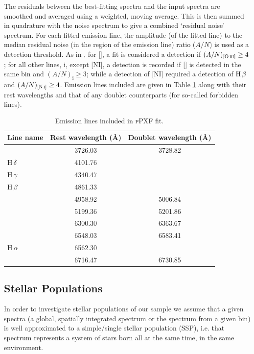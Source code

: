 		The residuals between the best-fitting spectra and the input spectra are smoothed and averaged using a weighted, moving average. This is then summed in quadrature with the noise spectrum to give a combined `residual noise' spectrum. For each fitted emission line, the amplitude (of the fitted line) to the median residual noise (in the region of the emission line) ratio ($A/N$) is used as a detection threshold. As in \citet{Sarzi2005}, for [], a fit is considered a detection if $(A/N)_{[\text{\ion{O}{iii}}]} \ge 4$; for all other lines, i, except [NI], a detection is recorded if [] is detected in the same bin and $(A/N)_\mathrm{i} \ge 3$; while a detection of [NI] required a detection of H\,$\beta$ and $(A/N)_{[\text{\ion{N}{i}}]} \ge 4$. Emission lines included are given in Table \ref{tab:EmissionLine} along with their rest wavelengths and that of any doublet counterparts (for so-called forbidden lines). 

	 	\begin{table}
	 		\centering
	 	\begin{threeparttable}
	 		\caption{Emission lines included in \textsc{pPXF} fit.}
	 		\label{tab:EmissionLine}
	 		\begin{tabular}{l c c}
	 		\hline
	 		\hline
	 		Line name 		& Rest wavelength (\AA) & Doublet wavelength (\AA) \\
	 		\hline
	 		[\ion{O}{ii}] 	& 3726.03 & 3728.82 \\
	 		H\,$\delta$ 		& 4101.76 & \\
	 		H\,$\gamma$ 		& 4340.47 & \\
	 		H\,$\beta$ 		& 4861.33 & \\
	 		[\ion{O}{iii}] 	& 4958.92 & 5006.84 \\
	 		[\ion{N}{i}] 	& 5199.36 & 5201.86 \\
	 		[\ion{O}{i}] 	& 6300.30 & 6363.67 \\
	 		[\ion{N}{ii}] 	& 6548.03 & 6583.41 \\
	 		H\,$\alpha$ 		& 6562.30 &\\
	 		[\ion{S}{ii}] 	& 6716.47 & 6730.85 \\
	 		\hline
	 		\hline
	 		\end{tabular}
	 	\end{threeparttable}
	 	\end{table}




	 \subsection{Stellar Populations}
	 	\label{subsec:PopFit}
	 	In order to investigate stellar populations of our sample we assume that a given spectra (a global, spatially integrated spectrum or the spectrum from a given bin) is well approximated to a simple/single stellar population (SSP), i.e. that spectrum represents a system of stars born all at the same time, in the same environment. 

